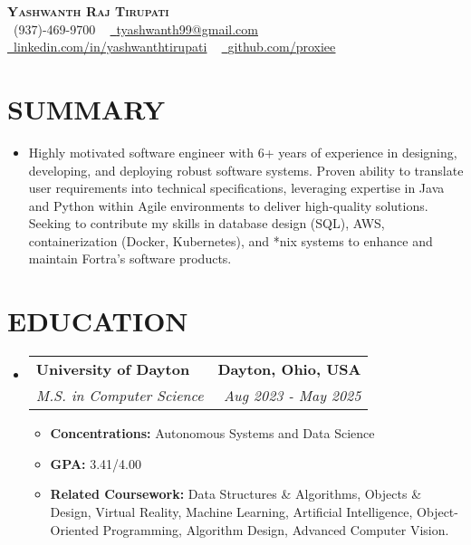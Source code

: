 \documentclass[letterpaper,11pt]{article}
\makeatletter
\newcommand{\resumeItem}[1]{\item\small{{#1 \vspace{-2pt}}}}
\newcommand{\resumeSubheading}[4]{\vspace{-2pt}\item\begin{tabular*}{0.97\textwidth}[t]{l@{\extracolsep{\fill}}r}\textbf{#1} & #2 \\\textit{\small#3} & \textit{\small #4} \\\end{tabular*}\vspace{-7pt}}
\newcommand{\resumeSubHeadingListStart}{\begin{itemize}[leftmargin=0.15in, label={}]}
\newcommand{\resumeSubHeadingListEnd}{\end{itemize}}
\newcommand{\resumeItemListStart}{\begin{itemize}}
\newcommand{\resumeItemListEnd}{\end{itemize}\vspace{-5pt}}
\makeatother
\begin{document}
\begin{center}
    \textbf{\Huge \scshape {\fontsize{15pt}{20pt}\selectfont Yashwanth Raj Tirupati} }\\ \vspace{1pt}
    \small \raisebox{-0.1\height}\faPhone\ (937)-469-9700 ~ \href{mailto:tyashwanth99@gmail.com}{\raisebox{-0.2\height}\faEnvelope\  \underline{tyashwanth99@gmail.com}} ~ 
    \href{https://linkedin.com/in/yashwanthtirupati}{\raisebox{-0.2\height}\faLinkedin\ \underline{linkedin.com/in/yashwanthtirupati}} ~ 
    \href{https://github.com/proxiee}{\raisebox{-0.2\height}\faGithub\ \underline{github.com/proxiee}}
    \vspace{-8pt}
\end{center}

\section{{\fontsize{9pt}{20pt}\selectfont \textbf{SUMMARY}}}
\resumeSubHeadingListStart
\resumeItem{Highly motivated software engineer with 6+ years of experience in designing, developing, and deploying robust software systems. Proven ability to translate user requirements into technical specifications, leveraging expertise in Java and Python within Agile environments to deliver high-quality solutions.  Seeking to contribute my skills in database design (SQL), AWS, containerization (Docker, Kubernetes), and *nix systems to enhance and maintain Fortra's software products.}
\resumeSubHeadingListEnd
\vspace{-18pt}

\section{{\fontsize{9pt}{20pt}\selectfont \textbf{EDUCATION}}}
\resumeSubHeadingListStart
\resumeSubheading{University of Dayton}{\textbf{Dayton, Ohio, USA}}{M.S. in Computer Science}{Aug 2023 - May 2025}
\resumeItemListStart
\resumeItem{\textbf{Concentrations:} Autonomous Systems and Data Science}
\resumeItem{\textbf{GPA:} 3.41/4.00}
\resumeItem{\textbf{Related Coursework:} Data Structures \& Algorithms, Objects \& Design, Virtual Reality, Machine Learning, Artificial Intelligence, Object-Oriented Programming, Algorithm Design, Advanced Computer Vision.}
\resumeItemListEnd
\resumeSubHeadingListEnd
\vspace{-18pt}
\end{document}
